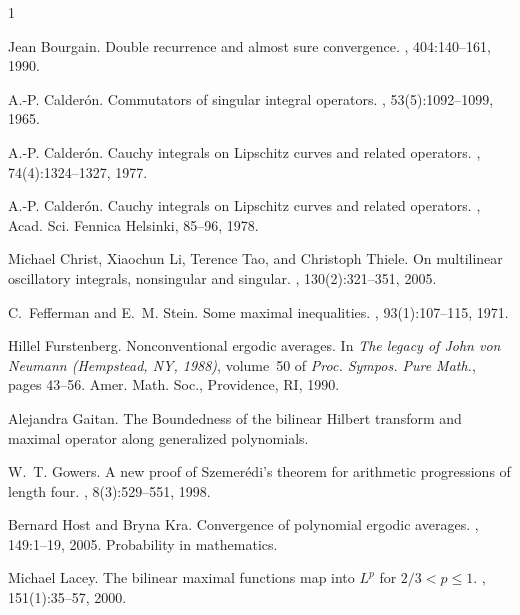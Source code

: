 \documentclass{amsart}
\theoremstyle{definition}
\theoremstyle{remark}
\numberwithin{equation}{section}
\begin{document}
\begin{thebibliography}{1}

   Jean Bourgain.
   \newblock Double recurrence and almost sure convergence.
   ,  404:140--161, 1990.

A.-P. Calder\'on.
\newblock Commutators of singular integral operators.
, 53(5):1092--1099, 1965.

A.-P. Calder\'on.
\newblock Cauchy integrals on {L}ipschitz curves and related operators.
, 74(4):1324--1327, 1977.

A.-P. Calder\'on.
\newblock Cauchy integrals on Lipschitz curves and related operators.
, Acad. Sci. Fennica Helsinki, 85--96, 1978.

Michael Christ, Xiaochun Li, Terence Tao, and Christoph Thiele.
\newblock On multilinear oscillatory integrals, nonsingular and singular.
, 130(2):321--351, 2005.

C.~Fefferman and E.~M. Stein.
\newblock Some maximal inequalities.
, 93(1):107--115, 1971.

Hillel Furstenberg.
\newblock Nonconventional ergodic averages.
\newblock In {\em The legacy of {J}ohn von {N}eumann ({H}empstead, {NY},
  1988)}, volume~50 of {\em Proc. Sympos. Pure Math.}, pages 43--56. Amer.
  Math. Soc., Providence, RI, 1990.

Alejandra Gaitan.
\newblock The Boundedness of the bilinear Hilbert transform and maximal operator along generalized polynomials.


W.~T. Gowers.
\newblock A new proof of {S}zemer{\'e}di's theorem for arithmetic progressions
  of length four.
, 8(3):529--551, 1998.

Bernard Host and Bryna Kra.
\newblock Convergence of polynomial ergodic averages.
, 149:1--19, 2005.
\newblock Probability in mathematics.

Michael Lacey.
\newblock The bilinear maximal functions map into {$L^p$} for {$2/3<p\leq1$}.
, 151(1):35--57, 2000.



\end{thebibliography}
\end{document}
